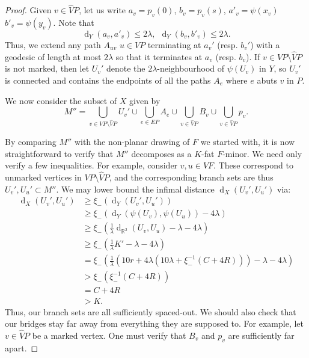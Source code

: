 \documentclass[10pt,a4paper]{amsart}
\DeclareMathOperator{\dist}{d}
\newcommand{\R}{\mathbb{R}}
\theoremstyle{definition}
\begin{document}
\begin{proof}
     Given $v \in \widehat VP$, let us write $a_v = p_v(0)$, $b_v = p_v(s)$, $a'_v = \psi(x_v)$ $b'_v = \psi(y_v)$. Note that 
     $$
     \dist_Y(a_v, a'_v) \leq 2\lambda, \ \ \dist_Y(b_v, b'_v) \leq 2\lambda.
     $$
     Thus, we extend any path $A_{uv}$ $u \in VP$ terminating at $a_v'$ (resp. $b_v'$) with a geodesic of length at most $2\lambda$ so that it terminates at $a_v$ (resp. $b_v$). 
     If $v \in VP\setminus \widehat VP$ is not marked, then let $U_v'$ denote the $2\lambda$-neighbourhood of $\psi(U_v)$ in $Y$, so $U_v'$ is connected and contains the endpoints of all the paths $A_{e}$ where $e$ abuts $v$ in $P$. 
     
     We now consider the subset of $X$ given by 
     $$
     M'' = \bigcup_{v \in VP \setminus \widehat VP} U_v' \cup \bigcup_{e\in EP} A_e \cup \bigcup_{v \in \widehat VP} B_v  \cup \bigcup_{v \in \widehat VP} p_v.  
     $$
     
     By comparing $M''$ with the non-planar drawing of $F$ we started with, it is now straightforward to verify that $M''$ decomposes as a $K$-fat $F$-minor. We need only verify a few inequalities. For example, consider $v,u \in VF$. These correspond to unmarked vertices in $VP \setminus \widehat VP$, and the corresponding branch sets are thus $U_v', U_u' \subset M''$.
     We may lower bound the infimal distance $\dist_X(U_v', U_u')$ via:
     \begin{align*}
         \dist_X(U_v', U_u') &\geq \xi_-(\dist_Y(U_v', U_u')) \\
         &\geq  \xi_-(  \dist_Y(\psi(U_v), \psi(U_u))  -4\lambda)  \\
         &\geq  \xi_-(  \tfrac 1 \lambda \dist_{\R^2}(U_v, U_u) - \lambda -4\lambda)\\ 
         &\geq  \xi_-(  \tfrac 1 \lambda K' - \lambda -4\lambda) \\
         &=  \xi_-(  \tfrac 1 \lambda (10r + 4\lambda (10\lambda + \xi_-^{-1}(C+4R))) - \lambda -4\lambda) \\
         &>  \xi_-(  \xi_-^{-1}(C+4R)) \\
         &=  C+4R \\
         &> K.
     \end{align*}
    Thus, our branch sets are all sufficiently spaced-out. 
    We should also check that our bridges stay far away from everything they are supposed to. For example, let $v \in \widehat VP$ be a marked vertex. One must verify that $B_v$ and $p_v$ are sufficiently far apart. 


\end{proof}
\end{document}
